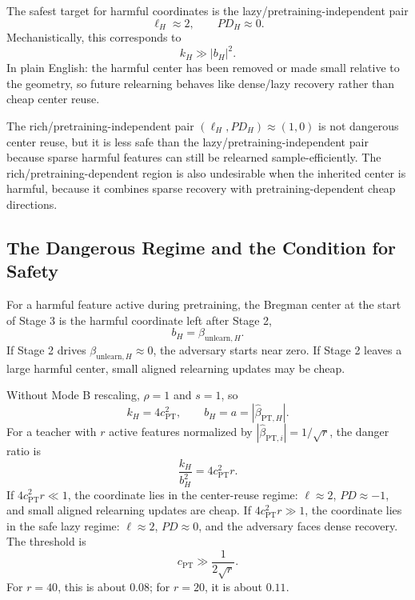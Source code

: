 \documentclass[11pt]{article}
\begin{document}
The safest target for harmful coordinates is the lazy/pretraining-independent pair
\begin{equation}
    \ell_H\approx2,
    \qquad
    PD_H\approx0.
\end{equation}
Mechanistically, this corresponds to
\begin{equation}
    k_H\gg |b_H|^2.
\end{equation}
In plain English: the harmful center has been removed or made small relative to the geometry, so future relearning behaves like dense/lazy recovery rather than cheap center reuse.

The rich/pretraining-independent pair \((\ell_H,PD_H)\approx(1,0)\) is not dangerous center reuse, but it is less safe than the lazy/pretraining-independent pair because sparse harmful features can still be relearned sample-efficiently. The rich/pretraining-dependent region is also undesirable when the inherited center is harmful, because it combines sparse recovery with pretraining-dependent cheap directions.

\subsection{The Dangerous Regime and the Condition for Safety}

For a harmful feature active during pretraining, the Bregman center at the start of Stage 3 is the harmful coordinate left after Stage 2,
\begin{equation}
    b_H=\beta_{\mathrm{unlearn},H}.
\end{equation}
If Stage 2 drives \(\beta_{\mathrm{unlearn},H}\approx0\), the adversary starts near zero. If Stage 2 leaves a large harmful center, small aligned relearning updates may be cheap.

Without Mode B rescaling, \(\rho=1\) and \(s=1\), so
\begin{equation}
    k_H=4c_{\mathrm{PT}}^2,
    \qquad
    b_H=a=|\widehat\beta_{\mathrm{PT},H}|.
\end{equation}
For a teacher with \(r\) active features normalized by \(|\widehat\beta_{\mathrm{PT},i}|=1/\sqrt r\), the danger ratio is
\begin{equation}
    \frac{k_H}{b_H^2}=4c_{\mathrm{PT}}^2r.
\end{equation}
If \(4c_{\mathrm{PT}}^2r\ll1\), the coordinate lies in the center-reuse regime: \(\ell\approx2\), \(PD\approx-1\), and small aligned relearning updates are cheap. If \(4c_{\mathrm{PT}}^2r\gg1\), the coordinate lies in the safe lazy regime: \(\ell\approx2\), \(PD\approx0\), and the adversary faces dense recovery. The threshold is
\begin{equation}
    c_{\mathrm{PT}}\gg\frac{1}{2\sqrt r}.
\end{equation}
For \(r=40\), this is about \(0.08\); for \(r=20\), it is about \(0.11\).
\end{document}
